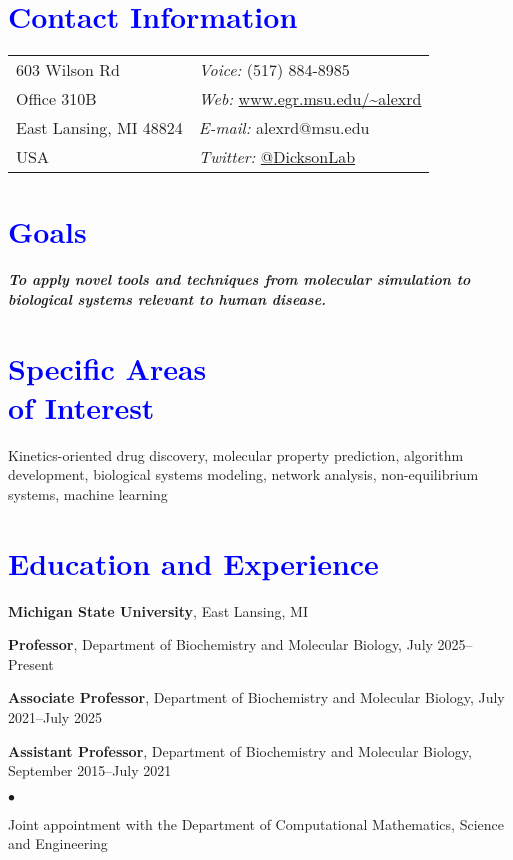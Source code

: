\documentclass[margin,line]{res}
\newenvironment{list1}{
  \begin{list}{\ding{113}}{%
      \setlength{\itemsep}{0.05in}
      \setlength{\parsep}{0in} \setlength{\parskip}{0in}
      \setlength{\topsep}{0in} \setlength{\partopsep}{0in} 
      \setlength{\leftmargin}{0.17in}}}{\end{list}}
\newenvironment{list2}{
  \begin{list}{$\bullet$}{%
      \setlength{\itemsep}{0.03in}
      \setlength{\parsep}{0in} \setlength{\parskip}{0in}
      \setlength{\topsep}{0.05in} \setlength{\partopsep}{0in} 
      \setlength{\leftmargin}{0.2in}}}{\end{list}}
\begin{document}

\begin{resume}
\section{\sc \textcolor{blue}{Contact Information}}
\vspace{.05in}
\begin{tabular}{@{}p{2in}p{4in}}
603 Wilson Rd             & {\it Voice:}  (517) 884-8985 \\            
Office 310B               & {\it Web:} \url{www.egr.msu.edu/~alexrd} \\         
East Lansing, MI 48824  & {\it E-mail:}  alexrd@msu.edu\\
USA & {\it Twitter:} \url{@DicksonLab}\\
\end{tabular}

\section{\sc \textcolor{blue}{ Goals}}
{\bf{\emph{To apply novel tools and techniques from molecular simulation to biological systems relevant to human disease.}}}

\section{\sc \textcolor{blue}{ Specific Areas \\ of Interest}}
Kinetics-oriented drug discovery, molecular property prediction, algorithm development, biological systems modeling, network analysis,
non-equilibrium systems, machine learning

\section{\sc \textcolor{blue}{ Education and Experience}}
{\bf Michigan State University}, East Lansing, MI\\
\vspace {-0.05in}
\begin{list1}
\item[] {\bf Professor}, Department of Biochemistry and Molecular Biology, July 2025--Present
\item[] {\bf Associate Professor}, Department of Biochemistry and Molecular Biology, July 2021--July 2025
\item[] {\bf Assistant Professor}, Department of Biochemistry and Molecular Biology, September 2015--July 2021
\begin{list2}
\item {Joint appointment with the Department of Computational Mathematics, Science and Engineering}
\end{list2}
\end{list1}


\end{resume}
\end{document}
